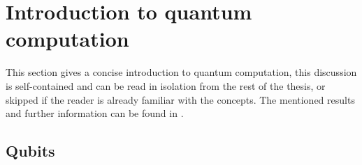 \section{Introduction to quantum computation}\label{sec:intro qc}


This section gives a concise introduction to quantum computation, this discussion is self-contained and can be read in isolation from the rest of the thesis, or skipped if the reader is already familiar with the concepts. The mentioned results and further information can be found in \cite{nielsen chuang}.



\subsection{Qubits}

